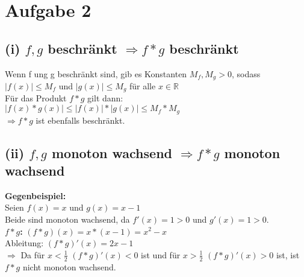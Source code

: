 \documentclass{article}
\begin{document}
\section{Aufgabe 2}
\subsection{(i) $f,g$ beschränkt $\Longrightarrow f*g$ beschränkt}
\begin{center}
    Wenn f ung g beschränkt sind, gib es Konstanten $M_f, M_g > 0$, sodass \\
    $|f(x)| \leq M_f$ und $|g(x)| \leq M_g$ für alle $x \in \mathbb{R}$ \\
    Für das Produkt $f*g$ gilt dann: \\
    $|f(x)*g(x)| \leq |f(x)|*|g(x)| \leq M_f*M_g$ \\
    $\Longrightarrow f*g$ ist ebenfalls beschränkt.
\end{center}

\subsection{(ii) $f,g$ monoton wachsend $\Longrightarrow f*g$ monoton wachsend}
\begin{center}
    \textbf{Gegenbeispiel:} \\
    Seien $f(x)=x$ und $g(x)=x-1$ \\
    Beide sind monoton wachsend, da $f'(x)=1 > 0$ und $g'(x)=1 > 0$. \\
    \textbf{$f*g$:} $(f*g)(x)=x*(x-1)=x^2-x$ \\
    Ableitung: $(f*g)'(x)=2x-1$\\
    $\Longrightarrow$ Da für $x<\frac{1}{2}$ $(f*g)'(x)<0$ ist und für  $x>\frac{1}{2}$ $(f*g)'(x)>0$ ist, ist $f*g$ nicht monoton wachsend.
\end{center}
\end{document}
